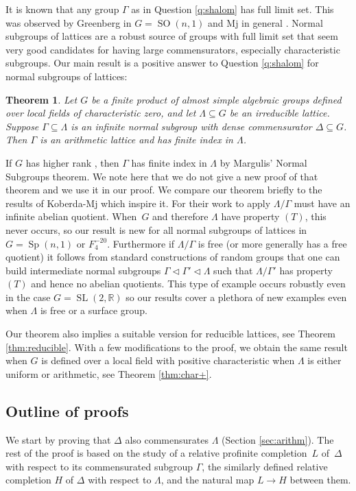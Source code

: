 \documentclass[11pt]{article}
\numberwithin{equation}{section}\providecommand{\llangle}{\langle\!\langle}\providecommand{\rrangle}{\rangle\!\rangle}\providecommand{\Asterisk}{\ast}
\DeclareMathOperator{\SL}{SL}
\DeclareMathOperator{\Sp}{Sp}
\DeclareMathOperator{\SO}{SO}
\newtheorem{thm}{Theorem}[section]
\theoremstyle{definition}
\begin{document}
It is known that any group $\Gamma$ as in Question \ref{q:shalom} has full limit set. This was observed by Greenberg in $G=\SO(n,1)$ and Mj in general \cite{greenberg-comm, mj-comm}. Normal subgroups of lattices are a robust source of groups with full limit set that seem very good candidates for having large commensurators, especially characteristic subgroups. Our main result is a positive answer to Question \ref{q:shalom} for normal subgroups of lattices:

\begin{thm}\label{thm:main}
Let $G$ be a finite product of almost simple algebraic groups defined over local fields of characteristic zero, and let $\Lambda\subseteq G$ be an irreducible lattice. Suppose $\Gamma\subseteq \Lambda$ is an infinite normal subgroup with dense commensurator $\Delta\subseteq G$. Then $\Gamma$ is an arithmetic lattice and has finite index in $\Lambda$.
\end{thm}

If $G$ has higher rank , then $\Gamma$ has finite index in $\Lambda$ by Margulis' Normal Subgroups theorem. We note here that we do not give a new proof of that theorem and we use it in our proof. We compare our theorem briefly to the results of Koberda-Mj which inspire it. For their work to apply $\Lambda/\Gamma$ must have
an infinite abelian quotient. When~$G$ and therefore $\Lambda$ have property $(T)$, this never occurs, so our result is new for all normal subgroups of lattices in $G=\Sp(n,1)$ or $F_4^{-20}$. Furthermore if $\Lambda/\Gamma$ is free (or more generally has a free quotient) it follows from standard constructions of random groups that one can build intermediate normal subgroups $\Gamma \lhd \Gamma' \lhd \Lambda$ such that $\Lambda/\Gamma'$ has property $(T)$ and hence no abelian quotients. This type of example occurs robustly even in the case $G=\SL(2, \mathbb{R})$ so our results cover a plethora of new examples even when $\Lambda$ is free or a surface group.

Our theorem also implies a suitable version for reducible lattices, see Theorem \ref{thm:reducible}. With a few modifications to the proof, we obtain the same result when $G$ is defined over a local field with positive characteristic when $\Lambda$ is either uniform or arithmetic, see Theorem \ref{thm:char+}.

\subsection{Outline of proofs}\label{sec:outline}
We start by proving that $\Delta$ also commensurates $\Lambda$ (Section \ref{sec:arithm}). The rest of the proof is based on the study of a relative profinite completion~$L$ of~$\Delta$ with respect to its commensurated subgroup $\Gamma$, the similarly defined relative completion $H$ of $\Delta$ with respect to $\Lambda$, and the natural map $L\to H$ between them.
\end{document}

